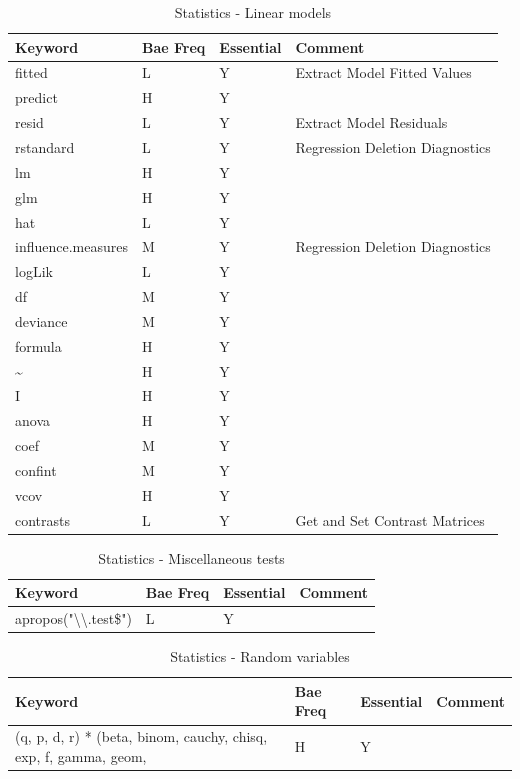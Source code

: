 \documentclass[10pt,]{krantz}
\theoremstyle{definition}
\theoremstyle{definition}
\theoremstyle{remark}
\begin{document}
\begin{table}

\caption{\label{tab:knitchunk17}Statistics - Linear models }
\centering
\begin{tabular}[t]{llll}
\toprule
Keyword & Bae Freq & Essential & Comment\\
\midrule
fitted & L & Y & Extract Model Fitted Values\\
predict & H & Y & \\
resid & L & Y & Extract Model Residuals\\
rstandard & L & Y & Regression Deletion Diagnostics\\
lm & H & Y & \\
\addlinespace
glm & H & Y & \\
hat & L & Y & \\
influence.measures & M & Y & Regression Deletion Diagnostics\\
logLik & L & Y & \\
df & M & Y & \\
\addlinespace
deviance & M & Y & \\
formula & H & Y & \\
\textasciitilde{} & H & Y & \\
I & H & Y & \\
anova & H & Y & \\
\addlinespace
coef & M & Y & \\
confint & M & Y & \\
vcov & H & Y & \\
contrasts & L & Y & Get and Set Contrast Matrices\\
\bottomrule
\end{tabular}
\end{table}

\begin{table}

\caption{\label{tab:knitchunk18}Statistics - Miscellaneous tests}
\centering
\begin{tabular}[t]{llll}
\toprule
Keyword & Bae Freq & Essential & Comment\\
\midrule
apropos("\textbackslash{}\textbackslash{}.test\$") & L & Y & \\
\bottomrule
\end{tabular}
\end{table}

\begin{table}

\caption{\label{tab:knitchunk19}Statistics - Random variables }
\centering
\begin{tabular}[t]{llll}
\toprule
Keyword & Bae Freq & Essential & Comment\\
\midrule
(q, p, d, r) * (beta, binom, cauchy, chisq, exp, f, gamma, geom, & H & Y & \\
\bottomrule
\end{tabular}
\end{table}
\end{document}
